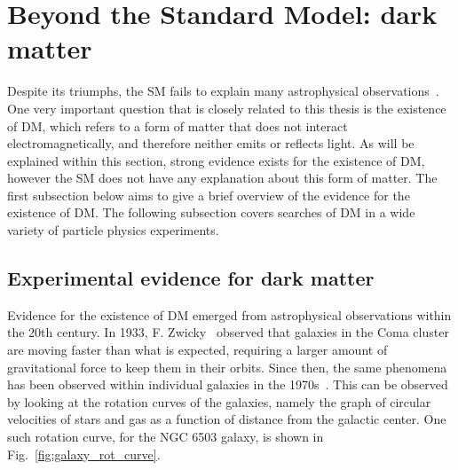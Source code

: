\section{Beyond the Standard Model: dark matter}

\graphicspath{{1_TheoreticalBackground/Figures/DM}}

Despite its triumphs, the SM fails to explain many astrophysical observations~\cite{Bertone:2004pz}.
One very important question that is closely related to this thesis is the existence of DM, which
refers to a form of matter that does not interact electromagnetically, and therefore neither emits or reflects light.
As will be explained within this section, strong evidence exists for the existence of DM, however the SM
does not have any explanation about this form of matter.
The first subsection below aims to give a brief overview of the evidence for the existence of DM.
The following subsection covers searches of DM in a wide variety of particle physics experiments.

\subsection{Experimental evidence for dark matter}
\label{subsec:dm_evidence}

Evidence for the existence of DM emerged from astrophysical observations within the 20th century. In 1933,
F. Zwicky~\cite{Zwicky:1933gu} observed that galaxies in the Coma cluster are moving faster than what
is expected, requiring a larger amount of gravitational force to keep them in their orbits. Since then, the
same phenomena has been observed within individual galaxies in the 1970s~\cite{Bertone:2004pz}. This can be observed
by looking at the rotation curves of the galaxies, namely the graph of circular velocities of stars and gas
as a function of distance from the galactic center. One such rotation curve, for the NGC 6503 galaxy, is shown in
Fig.~\ref{fig:galaxy_rot_curve}.

